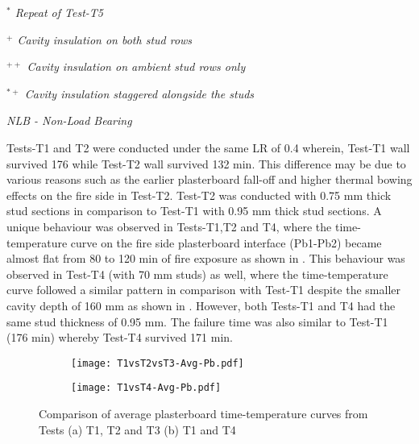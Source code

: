 \begin{sidewaystable}[!htbp]
\begin{threeparttable}
\begin{center}
\begin{tablenotes}
						\small
						\item \textit{\(^*\) Repeat of Test-T5}
						\item \textit{\(^+\) Cavity insulation on both stud rows}
						\item \textit{\(^{++}\) Cavity insulation on ambient stud rows only}
						\item \textit{\(^{*+}\) Cavity insulation staggered alongside the studs}
						\item \textit{NLB - Non-Load Bearing}
					\end{tablenotes}
		\end{center}
	\end{threeparttable}
\end{sidewaystable}%

Tests-T1 and T2 were conducted under the same LR of 0.4 wherein, Test-T1 wall survived 176 while Test-T2 wall survived 132 min. This difference may be due to various reasons such as the earlier plasterboard fall-off and higher thermal bowing effects on the fire side in Test-T2. Test-T2 was conducted with 0.75 mm thick stud sections in comparison to Test-T1 with 0.95 mm thick stud sections. A unique behaviour was observed in Tests-T1,T2 and T4, where the time-temperature curve on the fire side plasterboard interface (Pb1-Pb2) became almost flat from 80 to 120 min of fire exposure as shown in . This behaviour was observed in Test-T4 (with 70 mm studs) as well, where the time-temperature curve followed a similar pattern in comparison with Test-T1 despite the smaller cavity depth of 160 mm as shown in . However, both Tests-T1 and T4 had the same stud thickness of 0.95 mm. The failure time was also similar to Test-T1 (176 min) whereby Test-T4 survived 171 min. 
\begin{figure}[!htbp]
	\centering
	\begin{subfigure}[b]{0.9\textwidth}
		\centering
		\texttt{[image: T1vsT2vsT3-Avg-Pb.pdf]}
		\caption{}
		\label{subfig:T1vsT2vsT3-Avg-Pb}
	\end{subfigure}
	\begin{subfigure}[b]{0.7\textwidth}
		\centering
		\texttt{[image: T1vsT4-Avg-Pb.pdf]}
		\caption{}
		\label{subfig:T1vsT4-Avg-Pb}
	\end{subfigure}
	   \caption{Comparison of average plasterboard time-temperature curves from Tests (a) T1, T2 and T3 (b) T1 and T4}
	   \label{fig:T1vsT2vsT3vsT4-Avg-Pb}
\end{figure}
